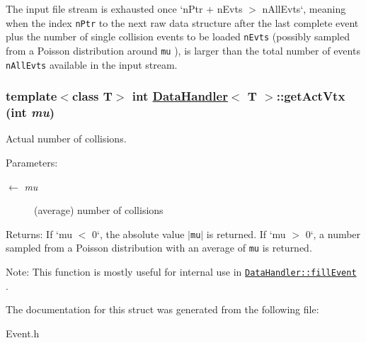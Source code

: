 The input file stream is exhausted once `n\-Ptr + n\-Evts $>$ n\-All\-Evts`, meaning when the index {\tt n\-Ptr} to the next raw data structure after the last complete event plus the number of single collision events to be loaded {\tt n\-Evts} (possibly sampled from a Poisson distribution around {\tt mu} ), is larger than the total number of events {\tt n\-All\-Evts} available in the input stream. \hypertarget{structDataHandler_4efc749da9cab2099a6ad1ca60146246}{
\subsubsection[getActVtx]{\setlength{\rightskip}{0pt plus 5cm}template$<$class T$>$ int \hyperlink{structDataHandler}{Data\-Handler}$<$ T $>$::get\-Act\-Vtx (int {\em mu})}}
\label{structDataHandler_4efc749da9cab2099a6ad1ca60146246}


Actual number of collisions. 

\begin{Desc}
\item[Parameters:]
\begin{description}
\item[\mbox{$\leftarrow$} {\em mu}](average) number of collisions\end{description}
\end{Desc}
\begin{Desc}
\item[Returns:]If `mu $<$ 0`, the absolute value {\tt $|$mu$|$} is returned. If `mu $>$ 0`, a number sampled from a Poisson distribution with an average of {\tt mu} is returned.\end{Desc}
\begin{Desc}
\item[Note:]This function is mostly useful for internal use in {\tt \hyperlink{structDataHandler_be7affae244cf17f9ef93b2d1216ce6d}{Data\-Handler::fill\-Event}} . \end{Desc}


The documentation for this struct was generated from the following file:\begin{CompactItemize}
\item 
Event.h\end{CompactItemize}
